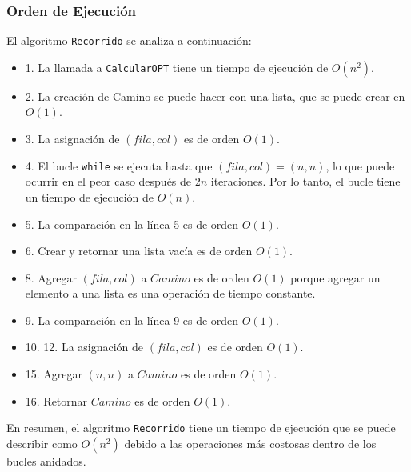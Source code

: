 \subsubsection{Orden de Ejecución}

El algoritmo \texttt{Recorrido} se analiza a continuación:
\begin{itemize}
	\item 1. La llamada a \texttt{CalcularOPT} tiene un tiempo de ejecución de $O(n^2)$.
	\item 2. La creación de Camino se puede hacer con una lista, que se puede crear en $O(1)$.
	\item 3. La asignación de $(fila, col)$ es de orden $O(1)$.
	\item 4. El bucle \texttt{while} se ejecuta hasta que $(fila, col) = (n, n)$, lo que puede ocurrir en el peor caso después de $2n$ iteraciones.
	      Por lo tanto, el bucle tiene un tiempo de ejecución de $O(n)$.
	\item 5. La comparación en la línea 5 es de orden $O(1)$.
	\item 6. Crear y retornar una lista vacía es de orden $O(1)$.
	\item 8. Agregar $(fila, col)$ a $Camino$ es de orden $O(1)$ porque agregar un elemento a una lista es una operación de tiempo constante.
	\item 9. La comparación en la línea 9 es de orden $O(1)$.
	\item 10. 12. La asignación de $(fila, col)$ es de orden $O(1)$.
	\item 15. Agregar $(n, n)$ a $Camino$ es de orden $O(1)$.
	\item 16. Retornar $Camino$ es de orden $O(1)$.
\end{itemize}

En resumen, el algoritmo \texttt{Recorrido} tiene un tiempo de ejecución que se puede describir
como $O(n^2)$ debido a las operaciones más costosas dentro de los bucles anidados.